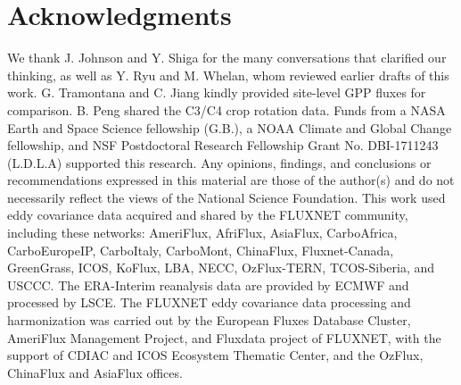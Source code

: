 \documentclass[10pt,letterpaper]{article}
\begin{document}
\nolinenumbers

\section*{Acknowledgments}
We thank J. Johnson and Y. Shiga for the many conversations that clarified our thinking, as well as Y. Ryu and M. Whelan, whom reviewed earlier drafts of this work. G. Tramontana and C. Jiang kindly provided site-level GPP fluxes for comparison. B. Peng shared the C3/C4 crop rotation data. Funds from a NASA Earth and Space Science fellowship (G.B.), a NOAA Climate and Global Change fellowship, and NSF Postdoctoral Research Fellowship Grant No. DBI-1711243 (L.D.L.A) supported this research. Any opinions, findings, and conclusions or recommendations expressed in this material are those of the author(s) and do not necessarily reflect the views of the National Science Foundation.  This work used eddy covariance data acquired and shared by the FLUXNET community, including these networks: AmeriFlux, AfriFlux, AsiaFlux, CarboAfrica, CarboEuropeIP, CarboItaly, CarboMont, ChinaFlux, Fluxnet-Canada, GreenGrass, ICOS, KoFlux, LBA, NECC, OzFlux-TERN, TCOS-Siberia, and USCCC. The ERA-Interim reanalysis data are provided by ECMWF and processed by LSCE. The FLUXNET eddy covariance data processing and harmonization was carried out by the European Fluxes Database Cluster, AmeriFlux Management Project, and Fluxdata project of FLUXNET, with the support of CDIAC and ICOS Ecosystem Thematic Center, and the OzFlux, ChinaFlux and AsiaFlux offices.

\printbibliography
\end{document}
